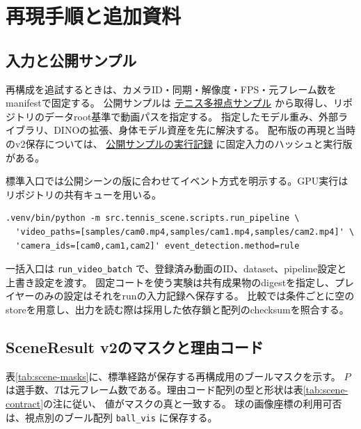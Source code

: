\section{再現手順と追加資料}
\label{app:reproducibility}

\subsection{入力と公開サンプル}

再構成を追試するときは、カメラID・同期・解像度・FPS・元フレーム数をmanifestで固定する。
公開サンプルは \href{https://huggingface.co/datasets/Motoki098/tennis-lab-multiview-sample}{テニス多視点サンプル}
から取得し、リポジトリのデータroot基準で動画パスを指定する。
指定したモデル重み、外部ライブラリ、DINOの拡張、身体モデル資産を先に解決する。
配布版の再現と当時のv2保存については、
\href{https://github.com/Motoki0705/tennis-lab/blob/main/knowledge/nodes/tennis_scene/000028-run-multiview-sample-standard-pipeline-20261021.md}{公開サンプルの実行記録}
に固定入力のハッシュと実行版がある。

標準入口では公開シーンの版に合わせてイベント方式を明示する。GPU実行はリポジトリの共有キューを用いる。

\begin{verbatim}
.venv/bin/python -m src.tennis_scene.scripts.run_pipeline \
  'video_paths=[samples/cam0.mp4,samples/cam1.mp4,samples/cam2.mp4]' \
  'camera_ids=[cam0,cam1,cam2]' event_detection.method=rule
\end{verbatim}

一括入口は \texttt{run\_video\_batch} で、登録済み動画のID、dataset、pipeline設定と上書き設定を渡す。
固定コートを使う実験は共有成果物のdigestを指定し、プレイヤーのみの設定はそれをrunの入力記録へ保存する。
比較では条件ごとに空のstoreを用意し、出力を読む際は採用した依存鎖と配列のchecksumを照合する。

\subsection{SceneResult v2のマスクと理由コード}

表\ref{tab:scene-masks}に、標準経路が保存する再構成用のブールマスクを示す。
$P$は選手数、$T$は元フレーム数である。理由コード配列の型と形状は表\ref{tab:scene-contract}の注に従い、
値\ev{schema}{0}がマスクの真と一致する。
球の画像座標の利用可否は、視点別のブール配列 \texttt{ball\_vis} に保存する。


